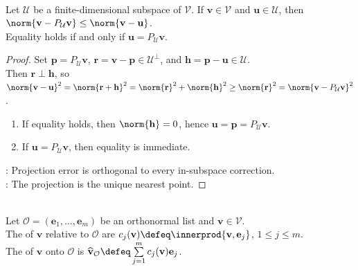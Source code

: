 \begin{theorem} \label{thm:orthogonal-projection-minimizes-distance} \\
Let $\mathcal{U}$ be a finite-dimensional subspace of $\mathcal{V}$. If $\mathbf{v}\in\mathcal{V}$ and $\mathbf{u}\in\mathcal{U}$, then $\norm{\mathbf{v}-P_{\mathcal{U}}\mathbf{v}}\leq\norm{\mathbf{v}-\mathbf{u}}$.\\
Equality holds if and only if $\mathbf{u}=P_{\mathcal{U}}\mathbf{v}$.
\begin{proof}
Set $\mathbf{p}=P_{\mathcal{U}}\mathbf{v}$, $\mathbf{r}=\mathbf{v}-\mathbf{p}\in\mathcal{U}^{\perp}$, and $\mathbf{h}=\mathbf{p}-\mathbf{u}\in\mathcal{U}$.\\
Then $\mathbf{r}\perp\mathbf{h}$, so $\norm{\mathbf{v}-\mathbf{u}}^2 =\norm{\mathbf{r}+\mathbf{h}}^2 =\norm{\mathbf{r}}^2+\norm{\mathbf{h}}^2 \geq\norm{\mathbf{r}}^2 =\norm{\mathbf{v}-P_{\mathcal{U}}\mathbf{v}}^2$.
\begin{enumerate}[label=\roman*.]
\setlength{\itemsep}{0pt}
\item[$(\Rightarrow)$] If equality holds, then $\norm{\mathbf{h}}=0$, hence $\mathbf{u}=\mathbf{p}=P_{\mathcal{U}}\mathbf{v}$.
\item[$(\Leftarrow)$] If $\mathbf{u}=P_{\mathcal{U}}\mathbf{v}$, then equality is immediate.
\end{enumerate}
: Projection error is orthogonal to every in-subspace correction.\\
: The projection is the unique nearest point.
\end{proof}
\end{theorem}

\begin{definition} \label{def:fourier-coefficients-and-expansion} \\
Let $\mathcal{O}=(\mathbf{e}_1,\ldots,\mathbf{e}_m)$ be an orthonormal list and $\mathbf{v}\in\mathcal{V}$.\\
The  of $\mathbf{v}$ relative to $\mathcal{O}$ are $c_j(\mathbf{v})\defeq\innerprod{\mathbf{v},\mathbf{e}_j}$, $1\leq j\leq m$.\\
The  of $\mathbf{v}$ onto $\mathcal{O}$ is $\widehat{\mathbf{v}}_{\mathcal{O}} \defeq \sum\limits_{j=1}^{m}c_j(\mathbf{v})\mathbf{e}_j$.
\end{definition}

